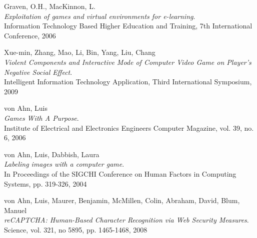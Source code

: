 \begin{thebibliography}{99}
  {\sc Graven,} O.H., {\sc MacKinnon,} L.\\
  \emph{Exploitation of games and virtual environments for e-learning}.\\
  Information Technology Based Higher Education and Training, 7th International Conference, 2006

  {\sc Xue-min,} Zhang, {\sc Mao,} Li, {\sc Bin,} Yang, {\sc Liu,} Chang\\
  \emph{Violent Components and Interactive Mode of Computer Video Game on Player's Negative Social Effect}.\\
  Intelligent Information Technology Application, Third International Symposium, 2009

  {\sc von Ahn,} Luis\\
  \emph{Games With A Purpose}.\\
  Institute of Electrical and Electronics Engineers Computer Magazine, vol. 39, no. 6, 2006

  {\sc von Ahn,} Luis, {\sc Dabbish,} Laura\\
  \emph{Labeling images with a computer game}.\\
  In Proceedings of the SIGCHI Conference on Human Factors in Computing Systems, pp. 319-326, 2004
 
  {\sc von Ahn,} Luis, {\sc Maurer,} Benjamin, {\sc McMillen,} Colin, {\sc Abraham,} David, {\sc Blum,} Manuel\\
  \emph{reCAPTCHA: Human-Based Character Recognition via Web Security Measures}.\\
  Science, vol. 321, no 5895, pp. 1465-1468, 2008
 
\end{thebibliography}
